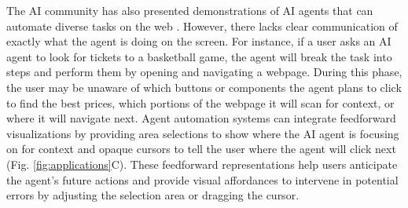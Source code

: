 The AI community has also presented demonstrations of AI agents that can automate diverse tasks on the web \cite{operator2025, dia2025}. However, there lacks clear communication of exactly what the agent is doing on the screen. For instance, if a user asks an AI agent to look for tickets to a basketball game, the agent will break the task into steps and perform them by opening and navigating a webpage. During this phase, the user may be unaware of which buttons or components the agent plans to click to find the best prices, which portions of the webpage it will scan for context, or where it will navigate next. Agent automation systems can integrate feedforward visualizations by providing area selections to show where the AI agent is focusing on for context and opaque cursors to tell the user where the agent will click next (Fig. \ref{fig:applications}C). These feedforward representations help users anticipate the agent’s future actions and provide visual affordances to intervene in potential errors by adjusting the selection area or dragging the cursor.









